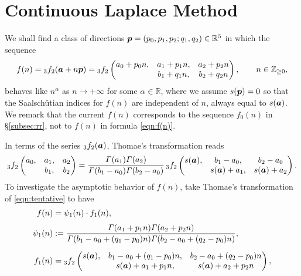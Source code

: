 \documentclass[a4paper,12pt]{article}
\theoremstyle{plain}
\def\R{\mathbb{R}}
\def\Z{\mathbb{Z}}
\def\vG{\varGamma}
\def\ba{\mbox{\boldmath $a$}}
\def\bp{\mbox{\boldmath $p$}}
\begin{document}
\section{Continuous Laplace Method} \label{sec:cspm}
We shall find a class of directions $\bp = (p_0, p_1, p_2; q_1, q_2) \in \R^5$ in which 
the sequence 
\begin{equation} \label{eqn:tentative} 
f(n) = {}_3f_2(\ba+n \bp) = {}_3f_2\begin{pmatrix}
a_0 + p_0 n, & a_1 + p_1 n, & a_2 + p_2 n \\
             & b_1 + q_1 n, & b_2 + q_2 n 
\end{pmatrix}, 
\qquad n \in \Z_{\ge 0}, 
\end{equation} 
behaves like $n^{\alpha}$ as $n \to +\infty$ for some $\alpha \in \R$, where 
we assume $s(\bp) = 0$ so that the Saalsch\"utian indices for $f(n)$ are 
independent of $n$, always equal to $s(\ba)$. 
We remark that the current $f(n)$ corresponds to the sequence $f_0(n)$ in 
\S \ref{subsec:rr}, not to $f(n)$ in formula \eqref{eqn:f(n)}.     
\par
In terms of the series ${}_3f_2(\ba)$, Thomae's transformation 
\cite[Corollary 3.3.6]{AAR} reads 
\[
{}_3f_2\begin{pmatrix}
a_0, & a_1, & a_2 \\
     & b_1, & b_2 
\end{pmatrix}
= \dfrac{\vG(a_1) \vG(a_2)}{\vG(b_1-a_0) \vG(b_2-a_0)} \, 
{}_3f_2\begin{pmatrix}
s(\ba), & b_1-a_0, & b_2-a_0 \\
     & s(\ba) + a_1, & s(\ba) + a_2 
\end{pmatrix}. 
\]
To investigate the asymptotic behavior of $f(n)$, take 
Thomae's transformation of \eqref{eqn:tentative} to have    
\begin{subequations} \label{eqn:tentative2}
\begin{align}
f(n) &= \psi_1(n) \cdot f_1(n), \label{eqn:tentative21} \\[1mm]  
\psi_1(n) &:= \dfrac{\vG( a_1 + p_1 n ) 
\vG( a_2 + p_2 n )}{ \vG( b_1 - a_0 + (q_1 - p_0) n ) 
\vG( b_2 - a_0 + (q_2 - p_0) n )}, 
\label{eqn:tentative22} \\[2mm]
f_1(n) &= 
{}_3f_2\begin{pmatrix}
s(\ba), & b_1 - a_0 + (q_1 - p_0) n, & b_2 - a_0 + (q_2 - p_0) n \\
             & s(\ba) + a_1 + p_1 n, & s(\ba) + a_2 + p_2 n 
\end{pmatrix}, \label{eqn:tentative23}
\end{align} 
\end{subequations}
\end{document}
